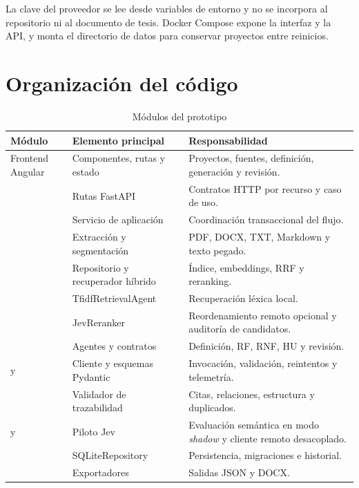 La clave del proveedor se lee desde variables de entorno y no se incorpora al repositorio ni al documento de tesis. Docker Compose expone la interfaz y la API, y monta el directorio de datos para conservar proyectos entre reinicios.

\section{Organización del código}

\begin{table}[H]
  \centering
  \caption{Módulos del prototipo}
  \label{tab:modulos-prototipo}
  \small
  \begin{tabularx}{\textwidth}{p{4.8cm}p{3.5cm}Y}
    \toprule
    Módulo & Elemento principal & Responsabilidad \\
    \midrule
    Frontend Angular & Componentes, rutas y estado & Proyectos, fuentes, definición, generación y revisión. \\
     & Rutas FastAPI & Contratos HTTP por recurso y caso de uso. \\
     & Servicio de aplicación & Coordinación transaccional del flujo. \\
     & Extracción y segmentación & PDF, DOCX, TXT, Markdown y texto pegado. \\
     & Repositorio y recuperador híbrido & Índice, embeddings, RRF y reranking. \\
     & TfidfRetrievalAgent & Recuperación léxica local. \\
     & JevReranker & Reordenamiento remoto opcional y auditoría de candidatos. \\
     & Agentes y contratos & Definición, RF, RNF, HU y revisión. \\
     y  & Cliente y esquemas Pydantic & Invocación, validación, reintentos y telemetría. \\
     & Validador de trazabilidad & Citas, relaciones, estructura y duplicados. \\
     y  & Piloto Jev & Evaluación semántica en modo \emph{shadow} y cliente remoto desacoplado. \\
     & SQLiteRepository & Persistencia, migraciones e historial. \\
     & Exportadores & Salidas JSON y DOCX. \\
    \bottomrule
  \end{tabularx}
\end{table}

